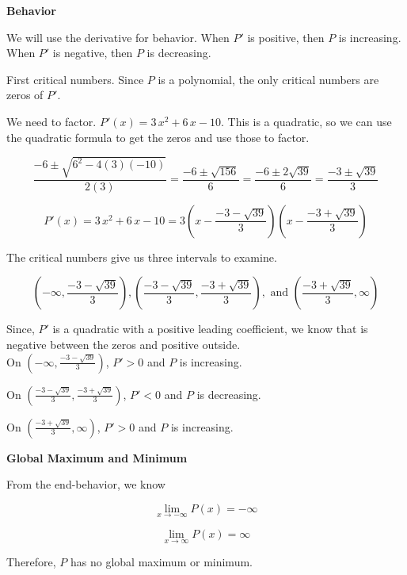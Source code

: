 \documentclass{ximera}
\begin{document}
\textbf{Behavior}

We will use the derivative for behavior. When $P'$ is positive, then $P$ is increasing.  When $P'$ is negative, then $P$ is decreasing.  


First critical numbers.  Since $P$ is a polynomial, the only critical numbers are zeros of $P'$.  


We need to factor. $P'(x) = 3 \, x^2 + 6 \, x - 10$.  This is a quadratic, so we can use the quadratic formula to get  the zeros and use those to factor. 


\[
\frac{-6 \pm \sqrt{6^2 - 4 (3)(-10)}}{2(3)} = \frac{-6 \pm \sqrt{156}}{6} = \frac{-6 \pm 2\sqrt{39}}{6} = \frac{-3 \pm \sqrt{39}}{3}
\]




\[
P'(x) = 3 \, x^2 + 6 \, x - 10 = 3 \left( x - \frac{-3 - \sqrt{39}}{3} \right) \left( x - \frac{-3 + \sqrt{39}}{3}  \right)
\]



The critical numbers give us three intervals to examine.

\[
\left( -\infty, \frac{-3 - \sqrt{39}}{3} \right), \left( \frac{-3 - \sqrt{39}}{3}, \frac{-3 + \sqrt{39}}{3} \right), \text{ and } \left( \frac{-3 + \sqrt{39}}{3}, \infty \right)
\]


Since, $P'$ is a quadratic with a positive leading coefficient, we know that is negative between the zeros and positive outside. \\



On $\left( -\infty, \frac{-3 - \sqrt{39}}{3} \right)$, $P' > 0$ and $P$ is increasing. 


On $\left( \frac{-3 - \sqrt{39}}{3}, \frac{-3 + \sqrt{39}}{3} \right)$, $P' < 0$ and $P$ is decreasing. 


On $\left( \frac{-3 + \sqrt{39}}{3}, \infty \right)$, $P' > 0$ and $P$ is increasing. 





\textbf{Global Maximum and Minimum}


From the end-behavior, we know

\[
\lim\limits_{x \to -\infty} P(x) = -\infty 
\]




\[
\lim\limits_{x \to \infty} P(x) = \infty 
\]



Therefore, $P$ has no global maximum or minimum. 
\end{document}
